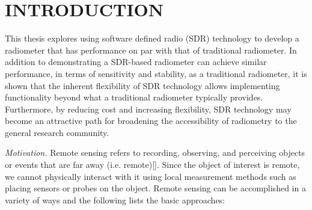 \chapter{INTRODUCTION}\label{ch:intro}




This thesis explores using software defined radio (SDR) technology to develop a radiometer that has performance on par with that of traditional radiometer.  In addition to demonstrating a SDR-based radiometer can achieve similar performance, in terms of sensitivity and stability, as a traditional radiometer, it is shown that the inherent flexibility of SDR technology allows implementing functionality beyond what a traditional radiometer typically provides.  Furthermore, by reducing cost and increasing flexibility, SDR technology may become an attractive path for broadening the accessibility of radiometry to the general research community.

\emph{Motivation.}  Remote sensing refers to recording, observing, and perceiving objects or events that are far away (i.e. remote)[\cite{weng2012}].  Since the object of interest is remote, we cannot physically interact with it using local measurement methods such as placing sensors or probes on the object.  Remote sensing can be accomplished in a variety of ways and the following lists the basic approaches:

